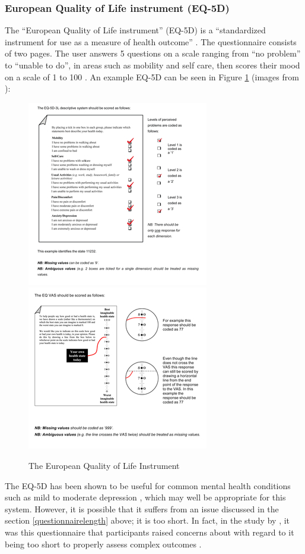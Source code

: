 \documentclass[11pt,openright,a4paper]{report}
\begin{document}
\newpage
\subsubsection{European Quality of Life instrument (EQ-5D)}
The \enquote{European Quality of Life instrument} (EQ-5D) is a \enquote{standardized instrument for use as a measure of health outcome} \parencite{eq5dabout}. The questionnaire consists of two pages. The user answers 5 questions on a scale ranging from \enquote{no problem} to \enquote{unable to do}, in areas such as mobility and self care, then scores their mood on a scale of 1 to 100 \parencite{eq5duse}. An example EQ-5D can be seen in Figure \ref{fig:eq5d} (images from \parencite{eq5duse}):

\begin{figure}[ht]
\caption{The European Quality of Life Instrument}
\includegraphics[width=.5\textwidth]{i/eq5d1.jpg}\hfill
\includegraphics[width=.5\textwidth]{i/eq5d2.jpg}
\label{fig:eq5d}
\end{figure}

The EQ-5D has been shown to be useful for common mental health conditions such as mild to moderate depression \parencite{brazier2010eq}, which may well be appropriate for this system. However, it is possible that it suffers from an issue discussed in the section \ref{questionnairelength} above; it is too short. In fact, in the study by \citeauthor{crawford2011selecting}, it was this questionnaire that participants raised concerns about with regard to it being too short to properly assess complex outcomes \parencite{crawford2011selecting}.
\end{document}
